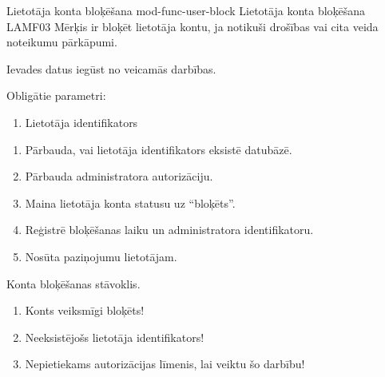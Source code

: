 \moduleFunctionTable
{Lietotāja konta bloķēšana}
{mod-func-user-block}
{Lietotāja konta bloķēšana}
{LAMF03}
{
	Mērķis ir bloķēt lietotāja kontu, ja notikuši drošības vai cita veida noteikumu pārkāpumi.
}
{
	Ievades datus iegūst no veicamās darbības.

	Obligātie parametri:
	\begin{enumerate}
		\item Lietotāja identifikators
	\end{enumerate}
}
{
	\begin{enumerate}
		\item Pārbauda, vai lietotāja identifikators eksistē datubāzē.
		\item Pārbauda administratora autorizāciju.
		\item Maina lietotāja konta statusu uz ``bloķēts''.
		\item Reģistrē bloķēšanas laiku un administratora identifikatoru.
		\item Nosūta paziņojumu lietotājam.
	\end{enumerate}
}
{
	Konta bloķēšanas stāvoklis.
}
{
	\begin{enumerate}
		\item Konts veiksmīgi bloķēts!
		\item Neeksistējošs lietotāja identifikators!
		\item Nepietiekams autorizācijas līmenis, lai veiktu šo darbību!
	\end{enumerate}
}
